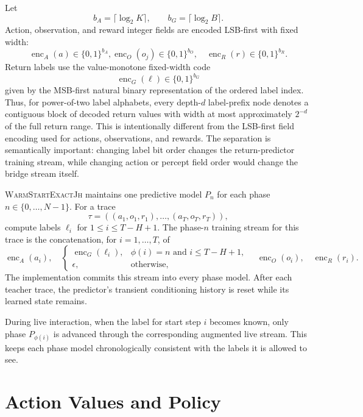 \documentclass[11pt]{article}
\newcommand{\Warm}{\textnormal{\textsc{WarmStartExactJh}}}
\begin{document}
Let
\[
b_A=\lceil\log_2 K\rceil,\qquad b_G=\lceil\log_2 B\rceil.
\]
Action, observation, and reward integer fields are encoded LSB-first with
fixed width:
\[
\operatorname{enc}_A(a)\in\{0,1\}^{b_A},
\operatorname{enc}_O(o_j)\in\{0,1\}^{b_O},
\quad
\operatorname{enc}_R(r)\in\{0,1\}^{b_R}.
\]
Return labels use the value-monotone fixed-width code
\[
\operatorname{enc}_G(\ell)\in\{0,1\}^{b_G}
\]
given by the MSB-first natural binary representation of the ordered label
index. Thus, for power-of-two label alphabets, every depth-\(d\) label-prefix
node denotes a contiguous block of decoded return values with width at most
approximately \(2^{-d}\) of the full return range. This is intentionally
different from the LSB-first field encoding used for actions, observations,
and rewards. The separation is semantically important: changing label bit
order changes the return-predictor training stream, while changing action or
percept field order would change the bridge stream itself.

\Warm{} maintains one predictive model \(P_n\) for each phase
\(n\in\{0,\dots,N-1\}\). For a trace
\[
\tau=((a_1,o_1,r_1),\dots,(a_T,o_T,r_T)),
\]
compute labels \(\ell_i\) for \(1\le i\le T-H+1\). The phase-\(n\)
training stream for this trace is the concatenation, for \(i=1,\dots,T\), of
\[
\operatorname{enc}_A(a_i),
\quad
\begin{cases}
\operatorname{enc}_G(\ell_i), & \phi(i)=n \text{ and } i\le T-H+1,\\
\epsilon, & \text{otherwise},
\end{cases}
\quad
\operatorname{enc}_O(o_i),
\quad
\operatorname{enc}_R(r_i).
\]
The implementation commits this stream into every phase model. After each
teacher trace, the predictor's transient conditioning history is reset while
its learned state remains.

During live interaction, when the label for start step \(i\) becomes known,
only phase \(P_{\phi(i)}\) is advanced through the corresponding augmented
live stream. This keeps each phase model chronologically consistent with the
labels it is allowed to see.

\section{Action Values and Policy}
\label{sec:policy}
\end{document}
